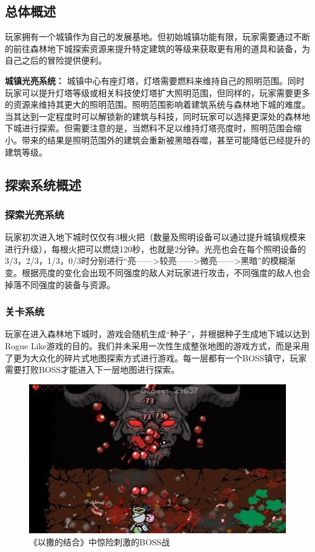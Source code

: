 \documentclass[UTF8,AutoFakeBold=1,AutoFakeSlant,zihao=-4]{cucthesis}
\begin{document}
\subsection{总体概述}
玩家拥有一个城镇作为自己的发展基地。但初始城镇功能有限，玩家需要通过不断的前往森林地下城探索资源来提升特定建筑的等级来获取更有用的道具和装备，为自己之后的冒险提供便利。

\textbf{城镇光亮系统：}
城镇中心有座灯塔，灯塔需要燃料来维持自己的照明范围。同时玩家可以提升灯塔等级或相关科技使灯塔扩大照明范围，但同样的，玩家需要更多的资源来维持其更大的照明范围。照明范围影响着建筑系统与森林地下城的难度。当其达到一定程度时可以解锁新的建筑与科技，同时玩家可以选择更深处的森林地下城进行探索。但需要注意的是，当燃料不足以维持灯塔亮度时，照明范围会缩小。带来的结果是照明范围外的建筑会重新被黑暗吞噬，甚至可能降低已经提升的建筑等级。

\subsection{探索系统概述}

\subsubsection{探索光亮系统}
玩家初次进入地下城时仅仅有3根火把（数量及照明设备可以通过提升城镇规模来进行升级），每根火把可以燃烧120秒，也就是2分钟。光亮也会在每个照明设备的3/3，2/3，1/3，0/3时分别进行“亮——>较亮——>微亮——>黑暗”的模糊渐变。根据亮度的变化会出现不同强度的敌人对玩家进行攻击，不同强度的敌人也会掉落不同强度的装备与资源。

\subsubsection{关卡系统}
玩家在进入森林地下城时，游戏会随机生成“种子”，并根据种子生成地下城以达到Rogue Like游戏的目的。我们并未采用一次性生成整张地图的游戏方式，而是采用了更为大众化的碎片式地图探索方式进行游戏。每一层都有一个BOSS镇守，玩家需要打败BOSS才能进入下一层地图进行探索。

\begin{figure}[ht]
    \centering
    \includegraphics[scale=0.72]{imgs/《以撒的结合》BOSS战.jpg}
    \caption{《以撒的结合》中惊险刺激的BOSS战}
\end{figure}
\end{document}
